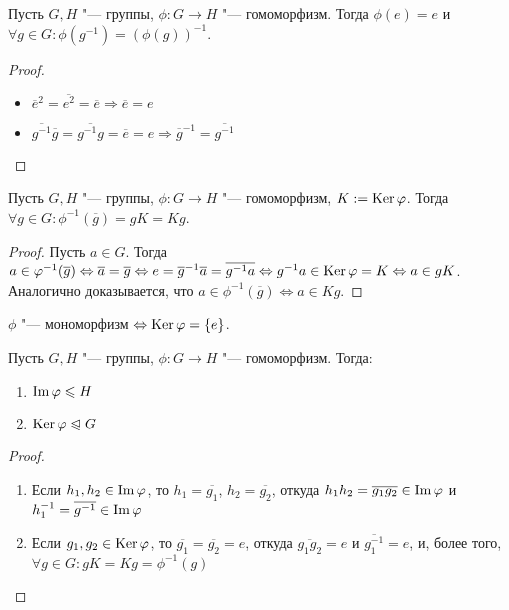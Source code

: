 \begin{proposition}
	Пусть $G, H$ "--- группы, $\phi: G \to H$ "--- гомоморфизм. Тогда $\phi(e) = e$ и $\forall g \in G: \phi(g^{-1}) = (\phi(g))^{-1}$.
\end{proposition}

\begin{proof}~
	\begin{itemize}
		\item $\overline{e}^2 = \overline{e^2} = \overline{e} \Rightarrow \overline{e} = e$
		\item $\overline{g^{-1}}\overline{g} = \overline{g^{-1}g} = \overline{e} = e \Rightarrow \overline{g}^{-1} = \overline{g^{-1}}$
	\end{itemize}
\end{proof}

\begin{proposition}
	Пусть $G, H$ "--- группы, $\phi: G \to H$ "--- гомоморфизм, $K := \operatorname{Ker}\varphi$. Тогда $\forall g \in G: \phi^{-1}(\overline{g}) = gK = Kg$.
\end{proposition}

\begin{proof}
	Пусть $a \in G$. Тогда $a \in \phi^{-1}(\overline{g}) \Leftrightarrow \overline{a} = \overline{g} \Leftrightarrow e \hm= \overline{g}^{-1}\overline{a} = \overline{g^{-1}a} \Leftrightarrow g^{-1}a \hm\in \ke\phi = K \Leftrightarrow a \in gK$. Аналогично доказывается, что $a \in \phi^{-1}(\overline{g}) \Leftrightarrow a \in Kg$.
\end{proof}

\begin{corollary}
	$\phi$ "--- мономорфизм $\Leftrightarrow \operatorname{Ker}\varphi = \{e\}$.
\end{corollary}

\begin{proposition}
	Пусть $G, H$ "--- группы, $\phi: G \to H$ "--- гомоморфизм. Тогда:
	\begin{enumerate}
		\item $\operatorname{Im}\varphi \leqslant H$
		\item $\operatorname{Ker}\varphi \trianglelefteqslant G$
	\end{enumerate}
\end{proposition}

\begin{proof}~
	\begin{enumerate}
		\item Если $h_1, h_2 \in \operatorname{Im}\varphi$, то $h_1 = \overline{g_1}$, $h_2 = \overline{g_2}$, откуда $h_1h_2 = \overline{g_1g_2} \hm\in \im\phi$ и $h_1^{-1} = \overline{g^{-1}} \in \operatorname{Im}\varphi$
		\item Если $g_1, g_2 \in \operatorname{Ker}\varphi$, то $\overline{g_1} = \overline{g_2} = e$, откуда $\overline{g_1g_2} = e$ и $\overline{g_1^{-1}} = e$, и, более того, $\forall g \in G: gK = Kg = \phi^{-1}(g)$
	\end{enumerate}
\end{proof}

